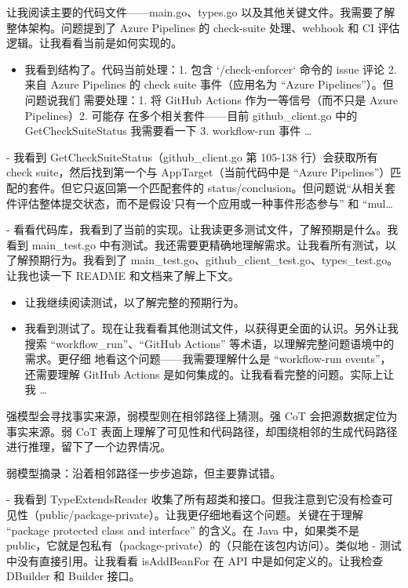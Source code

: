 让我阅读主要的代码文件——main.go、types.go 以及其他关键文件。我需要了解整体架构。问题提到了 Azure Pipelines 的 check-suite 处理、webhook 和 CI 评估逻辑。让我看看当前是如何实现的。

\begin{itemize}
\tightlist
\item
  我看到结构了。代码当前处理：1. 包含 `/check-enforcer` 命令的 issue 评论 2. 来自
  Azure Pipelines 的 check suite 事件（应用名为 ``Azure Pipelines''）。但问题说我们
  需要处理：1. 将 GitHub Actions 作为一等信号（而不只是 Azure Pipelines）2. 可能存
  在多个相关套件——目前 github\_client.go 中的 GetCheckSuiteStatus 我需要看一下 3.
  workflow-run 事件 \ldots{}
\end{itemize}

- 我看到 GetCheckSuiteStatus（github\_client.go 第 105-138 行）会获取所有 check suite，然后找到第一个与 AppTarget（当前代码中是 ``Azure Pipelines''）匹配的套件。但它只返回第一个匹配套件的 status/conclusion。但问题说``从相关套件评估整体提交状态，而不是假设'只有一个应用或一种事件形态参与'' 和 ``mul\ldots{}

- 看看代码库，我看到了当前的实现。让我读更多测试文件，了解预期是什么。我看到 main\_test.go 中有测试。我还需要更精确地理解需求。让我看所有测试，以了解预期行为。我看到了 main\_test.go、github\_client\_test.go、types\_test.go。让我也读一下 README 和文档来了解上下文。

\begin{itemize}
\item
  让我继续阅读测试，以了解完整的预期行为。
\item
  我看到测试了。现在让我看看其他测试文件，以获得更全面的认识。另外让我搜索
  ``workflow\_run''、``GitHub Actions'' 等术语，以理解完整问题语境中的需求。更仔细
  地看这个问题——我需要理解什么是 ``workflow-run events''，还需要理解 GitHub Actions
  是如何集成的。让我看看完整的问题。实际上让我 \ldots{}
\end{itemize}

强模型会寻找事实来源，弱模型则在相邻路径上猜测。强 CoT 会把源数据定位为事实来源。弱 CoT 表面上理解了可见性和代码路径，却围绕相邻的生成代码路径进行推理，留下了一个边界情况。

弱模型摘录：沿着相邻路径一步步追踪，但主要靠试错。

- 我看到 TypeExtendsReader 收集了所有超类和接口。但我注意到它没有检查可见性（public/package-private）。让我更仔细地看这个问题。关键在于理解 ``package protected class and interface'' 的含义。在 Java 中，如果类不是 public，它就是包私有（package-private）的（只能在该包内访问）。类似地 - 测试中没有直接引用。让我看看 isAddBeanFor 在 API 中是如何定义的。让我检查 DBuilder 和 Builder 接口。

